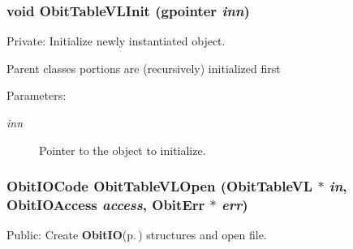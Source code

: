 \subsubsection{\setlength{\rightskip}{0pt plus 5cm}void Obit\-Table\-VLInit (gpointer {\em inn})}\label{ObitTableVL_8c_a8}


Private: Initialize newly instantiated object. 

Parent classes portions are (recursively) initialized first \begin{Desc}
\item[Parameters:]
\begin{description}
\item[{\em inn}]Pointer to the object to initialize. \end{description}
\end{Desc}
\subsubsection{\setlength{\rightskip}{0pt plus 5cm}Obit\-IOCode Obit\-Table\-VLOpen ({\bf Obit\-Table\-VL} $\ast$ {\em in}, Obit\-IOAccess {\em access}, {\bf Obit\-Err} $\ast$ {\em err})}\label{ObitTableVL_8c_a21}


Public: Create {\bf Obit\-IO}{\rm (p.\,\pageref{structObitIO})} structures and open file. 

